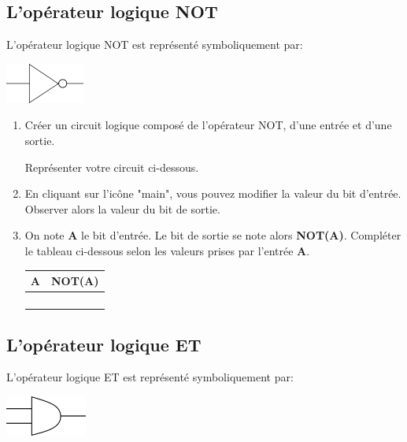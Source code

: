 \documentclass[11pt,a4paper]{article}
\begin{document}
\subsection*{\Large L'opérateur logique NOT }
L'opérateur logique NOT est représenté symboliquement par:
\begin{center}
 \includegraphics[scale=0.8]{img/operateurNOT.png}
 \end{center} 
\begin{enumerate}
\item Créer un circuit logique composé de l'opérateur NOT, d'une entrée et d'une sortie.

Représenter votre circuit ci-dessous.\vspace{1.5cm}
\item En cliquant sur l'icône "main", vous pouvez modifier la valeur du bit d'entrée. Observer alors la valeur du bit de sortie.
\item On note \textbf{A} le bit d'entrée. Le bit de sortie se note alors \textbf{NOT(A)}.
Compléter le tableau ci-dessous selon les valeurs prises par l'entrée \textbf{A}.

\begin{center}
\begin{tabular}{*{2}{|C{1.5cm}}|}\hline
A & NOT(A) \\\hline
 & \\
 & \\
 & \\
 & \\\hline
\end{tabular}
\end{center}


\end{enumerate}


\subsection*{\Large L'opérateur logique ET }

L'opérateur logique ET est représenté symboliquement par:
\begin{center}
\includegraphics[scale=0.8]{img/operateurET.png}
\end{center} 
\end{document}
